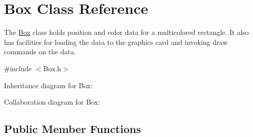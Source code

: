\hypertarget{class_box}{}\section{Box Class Reference}
\label{class_box}


The \hyperlink{class_box}{Box} class holds position and color data for a multicolored rectangle. It also has facilities for loading the data to the graphics card and invoking draw commands on the data.  




{\ttfamily \#include $<$Box.\+h$>$}



Inheritance diagram for Box\+:


Collaboration diagram for Box\+:
\subsection*{Public Member Functions}
